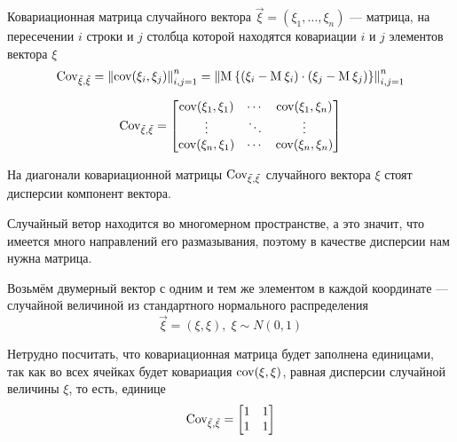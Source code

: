 \begin{definition}
    \label{def:covMatrix}

    Ковариационная матрица случайного вектора
    $\vec{\xi} = \left( \xi_1, \dots, \xi_n \right)$ --- матрица, на пересечении
    $i$ строки и $j$ столбца которой находятся ковариации $i$ и $j$ элементов
    вектора $\xi$
    $$\operatorname{Cov_{\vec{\xi}, \vec{\xi}}}
        = \left\| \operatorname{cov}\!\left( \xi_i, \xi_j \right) \right\|_{i,j=1}^n
        = \left\| \operatorname{M}_{} 
            \left\{ \left( \xi_i - \operatorname{M}_{} \xi_i \right)
                \cdot \left( \xi_j - \operatorname{M}_{} \xi_j \right)
            \right\} \right\|_{i,j=1}^n$$

    $$\operatorname{Cov_{\vec{\xi}, \vec{\xi}}} =
    \begin{bmatrix}
        \operatorname{cov}\!\left( \xi_1, \xi_1 \right) & \cdots & \operatorname{cov}\!\left( \xi_1, \xi_n \right) \\
        \vdots & \ddots & \vdots \\
        \operatorname{cov}\!\left( \xi_n, \xi_1 \right) & \cdots & \operatorname{cov}\!\left( \xi_n, \xi_n \right)
    \end{bmatrix}$$

\end{definition}

\begin{remark}
    На диагонали ковариационной матрицы $\operatorname{Cov_{\vec{\xi}, \vec{\xi}}}$
    случайного вектора $\xi$ стоят дисперсии компонент вектора.
\end{remark}

Случайный ветор находится во многомерном пространстве, а это значит,
что имеется много направлений его размазывания, поэтому в качестве дисперсии
нам нужна матрица.

\begin{example}
    Возьмём двумерный вектор с одним и тем же элементом
    в каждой координате --- случайной величиной из стандартного нормального
    распределения
    $$\vec{\xi} = \left( \xi, \xi \right),\; \xi \sim N\left( 0, 1 \right)$$

    Нетрудно посчитать, что ковариационная матрица будет заполнена единицами,
    так как во всех ячейках будет ковариация $\operatorname{cov}\!\left( \xi, \xi \right)$, равная
    дисперсии случайной величины $\xi$, то есть, единице
    $$\operatorname{Cov_{\vec{\xi}, \vec{\xi}}} =
    \begin{bmatrix}
        1 & 1 \\
        1 & 1
    \end{bmatrix}$$
\end{example}

